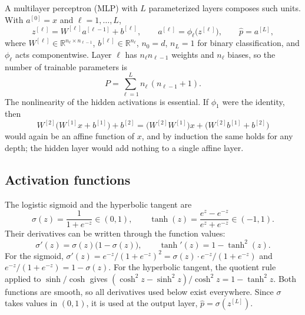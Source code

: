 A multilayer perceptron (MLP) with $L$ parameterized layers composes such units. With $a^{[0]}=x$ and $\ell=1,\dots,L$,
\begin{equation}
  z^{[\ell]}=W^{[\ell]}a^{[\ell-1]}+b^{[\ell]},\qquad a^{[\ell]}=\phi_\ell\bigl(z^{[\ell]}\bigr),\qquad \hat p=a^{[L]},
  \label{eq:forward}
\end{equation}
where $W^{[\ell]}\in\mathbb{R}^{n_\ell\times n_{\ell-1}}$, $b^{[\ell]}\in\mathbb{R}^{n_\ell}$, $n_0=d$, $n_L=1$ for binary classification, and $\phi_\ell$ acts componentwise. Layer $\ell$ has $n_\ell n_{\ell-1}$ weights and $n_\ell$ biases, so the number of trainable parameters is
\begin{equation}
  P=\sum_{\ell=1}^{L} n_\ell\,(n_{\ell-1}+1).
  \label{eq:nparams}
\end{equation}
The nonlinearity of the hidden activations is essential. If $\phi_1$ were the identity, then
\begin{equation*}
  W^{[2]}\bigl(W^{[1]}x+b^{[1]}\bigr)+b^{[2]}=\bigl(W^{[2]}W^{[1]}\bigr)x+\bigl(W^{[2]}b^{[1]}+b^{[2]}\bigr)
\end{equation*}
would again be an affine function of $x$, and by induction the same holds for any depth; the hidden layer would add nothing to a single affine layer.

\subsection{Activation functions}
\label{sec:prelim-act}

The logistic sigmoid and the hyperbolic tangent are
\begin{equation}
  \sigma(z)=\frac{1}{1+e^{-z}}\in(0,1),\qquad \tanh(z)=\frac{e^{z}-e^{-z}}{e^{z}+e^{-z}}\in(-1,1).
  \label{eq:activations}
\end{equation}
Their derivatives can be written through the function values:
\begin{equation}
  \sigma'(z)=\sigma(z)\bigl(1-\sigma(z)\bigr),\qquad \tanh'(z)=1-\tanh^{2}(z).
  \label{eq:actderiv}
\end{equation}
For the sigmoid, $\sigma'(z)=e^{-z}/(1+e^{-z})^{2}=\sigma(z)\cdot e^{-z}/(1+e^{-z})$ and $e^{-z}/(1+e^{-z})=1-\sigma(z)$. For the hyperbolic tangent, the quotient rule applied to $\sinh/\cosh$ gives $(\cosh^{2}z-\sinh^{2}z)/\cosh^{2}z=1-\tanh^{2}z$. Both functions are smooth, so all derivatives used below exist everywhere. Since $\sigma$ takes values in $(0,1)$, it is used at the output layer, $\hat p=\sigma(z^{[L]})$.

